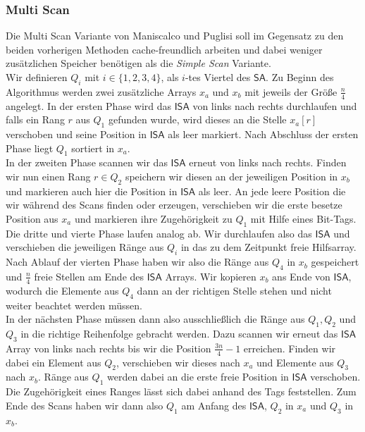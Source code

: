 \subsubsection{Multi Scan}
Die Multi Scan Variante von Maniscalco und Puglisi \cite{Maniscalco} soll im Gegensatz zu den beiden vorherigen Methoden cache-freundlich arbeiten und dabei weniger zusätzlichen Speicher benötigen als die \textit{Simple Scan} Variante.\\
Wir definieren $Q_i$ mit $i \in \{1,2,3,4\}$, als $i$-tes Viertel des $\mathsf{SA}$. Zu Beginn des Algorithmus werden zwei zusätzliche Arrays $x_a$ und $x_b$ mit jeweils der Größe $\frac{n}{4}$ angelegt. In der ersten Phase wird das $\mathsf{ISA}$ von links nach rechts durchlaufen und falls ein Rang $r$ aus $Q_1$ gefunden wurde, wird dieses an die Stelle $x_a[r]$ verschoben und seine Position in $\mathsf{ISA}$ als leer markiert. Nach Abschluss der ersten Phase liegt $Q_1$ sortiert in $x_a$.\\
In der zweiten Phase scannen wir das $\mathsf{ISA}$ erneut von links nach rechts. Finden wir nun einen Rang $r \in Q_2$ speichern wir diesen an der jeweiligen Position in $x_b$ und markieren auch hier die Position in $\mathsf{ISA}$ als leer. An jede leere Position die wir während des Scans finden oder erzeugen, verschieben wir die erste besetze Position aus $x_a$ und markieren ihre Zugehörigkeit zu $Q_1$ mit Hilfe eines Bit-Tags. \\
Die dritte und vierte Phase laufen analog ab. Wir durchlaufen also das $\mathsf{ISA}$ und verschieben die jeweiligen Ränge aus $Q_i$ in das zu dem Zeitpunkt freie Hilfsarray. \\
Nach Ablauf der vierten Phase haben wir also die Ränge aus $Q_4$ in $x_b$ gespeichert und $\frac{n}{4}$ freie Stellen am Ende des $\mathsf{ISA}$ Arrays. Wir kopieren $x_b$ ans Ende von $\mathsf{ISA}$, wodurch die Elemente aus $Q_4$ dann an der richtigen Stelle stehen und nicht weiter beachtet werden müssen.\\
In der nächsten Phase müssen dann also ausschließlich die Ränge aus $Q_1,Q_2$ und $Q_3$ in die richtige Reihenfolge gebracht werden. Dazu scannen wir erneut das $\mathsf{ISA}$ Array von links nach rechts bis wir die Position $\frac{3n}{4}-1$ erreichen. Finden wir dabei ein Element aus $Q_2$, verschieben wir dieses nach $x_a$ und Elemente aus $Q_3$ nach $x_b$. Ränge aus $Q_1$ werden dabei an die erste freie Position in $\mathsf{ISA}$ verschoben. Die Zugehörigkeit eines Ranges lässt sich dabei anhand des Tags feststellen. Zum Ende des Scans haben wir dann also $Q_1$ am Anfang des $\mathsf{ISA}$, $Q_2$ in $x_a$ und $Q_3$ in $x_b$. \\
